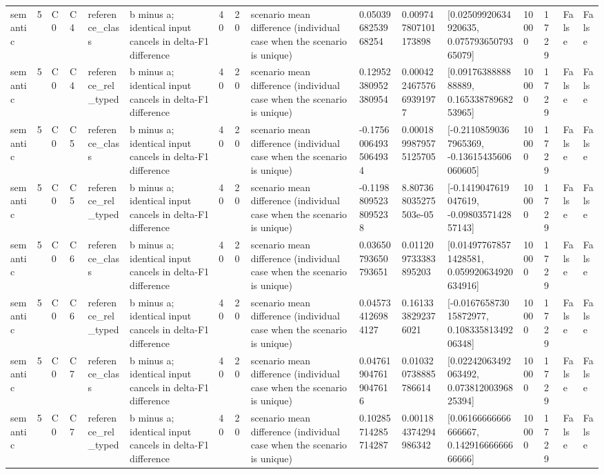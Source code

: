 \begin{tabular}{llllllllllllllll}
semantic & 5 & C0 & C4 & reference\_class & b minus a; identical input cancels in delta-F1 difference & 40 & 20 & scenario mean difference (individual case when the scenario is unique) & 0.0503968253968254 & 0.009747807101173898 & [0.02509920634920635, 0.07579365079365079] & 10000 & 1729 & False & False \\
semantic & 5 & C0 & C4 & reference\_rel\_typed & b minus a; identical input cancels in delta-F1 difference & 40 & 20 & scenario mean difference (individual case when the scenario is unique) & 0.12952380952380954 & 0.00042246757669391977 & [0.0917638888888889, 0.16533878968253965] & 10000 & 1729 & False & False \\
semantic & 5 & C0 & C5 & reference\_class & b minus a; identical input cancels in delta-F1 difference & 40 & 20 & scenario mean difference (individual case when the scenario is unique) & -0.17560064935064934 & 0.0001899879575125705 & [-0.21108590367965369, -0.13615435606060605] & 10000 & 1729 & False & False \\
semantic & 5 & C0 & C5 & reference\_rel\_typed & b minus a; identical input cancels in delta-F1 difference & 40 & 20 & scenario mean difference (individual case when the scenario is unique) & -0.11988095238095238 & 8.807368035275503e-05 & [-0.1419047619047619, -0.0980357142857143] & 10000 & 1729 & False & False \\
semantic & 5 & C0 & C6 & reference\_class & b minus a; identical input cancels in delta-F1 difference & 40 & 20 & scenario mean difference (individual case when the scenario is unique) & 0.03650793650793651 & 0.011209733383895203 & [0.014977678571428581, 0.059920634920634916] & 10000 & 1729 & False & False \\
semantic & 5 & C0 & C6 & reference\_rel\_typed & b minus a; identical input cancels in delta-F1 difference & 40 & 20 & scenario mean difference (individual case when the scenario is unique) & 0.045734126984127 & 0.1613338292376021 & [-0.016765873015872977, 0.10833581349206348] & 10000 & 1729 & False & False \\
semantic & 5 & C0 & C7 & reference\_class & b minus a; identical input cancels in delta-F1 difference & 40 & 20 & scenario mean difference (individual case when the scenario is unique) & 0.047619047619047616 & 0.010320738885786614 & [0.02242063492063492, 0.07381200396825394] & 10000 & 1729 & False & False \\
semantic & 5 & C0 & C7 & reference\_rel\_typed & b minus a; identical input cancels in delta-F1 difference & 40 & 20 & scenario mean difference (individual case when the scenario is unique) & 0.10285714285714287 & 0.001184374294986342 & [0.06166666666666667, 0.14291666666666666] & 10000 & 1729 & False & False \\

\end{tabular}
